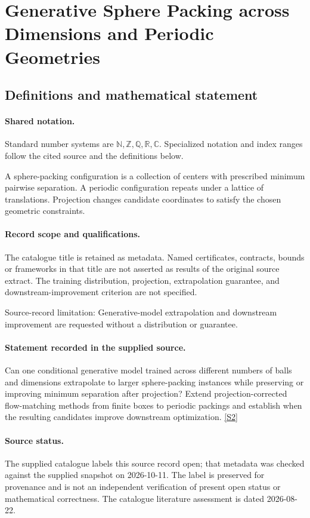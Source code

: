 \documentclass[11pt]{article}
\newcommand{\sref}[2]{\hyperlink{source:#1:#2}{[S#2]}}
\begin{document}
\section{Generative Sphere Packing across Dimensions and Periodic Geometries}\label{statement}

\subsection{Definitions and mathematical statement}

\paragraph{Shared notation.}Standard number systems are $\mathbb N,\mathbb Z,\mathbb Q,\mathbb R,\mathbb C$. Specialized notation and index ranges follow the cited source and the definitions below.


A sphere-packing configuration is a collection of centers with prescribed minimum pairwise separation. A periodic configuration repeats under a lattice of translations. Projection changes candidate coordinates to satisfy the chosen geometric constraints.
\paragraph{Record scope and qualifications.}
The catalogue title is retained as metadata. Named certificates, contracts, bounds or frameworks in that title are not asserted as results of the original source extract.
The training distribution, projection, extrapolation guarantee, and downstream-improvement criterion are not specified.

Source-record limitation: Generative-model extrapolation and downstream improvement are requested without a distribution or guarantee.
\paragraph{Statement recorded in the supplied source.}
Can one conditional generative model trained across different numbers of balls and dimensions extrapolate to larger sphere-packing instances while preserving or improving minimum separation after projection? Extend projection-corrected flow-matching methods from finite boxes to periodic packings and establish when the resulting candidates improve downstream optimization. \sref{statement}{2}
\paragraph{Source status.}
The supplied catalogue labels this source record open; that metadata was checked against the supplied snapshot on 2026-10-11. The label is preserved for provenance and is not an independent verification of present open status or mathematical correctness. The catalogue literature assessment is dated 2026-08-22.
\end{document}
